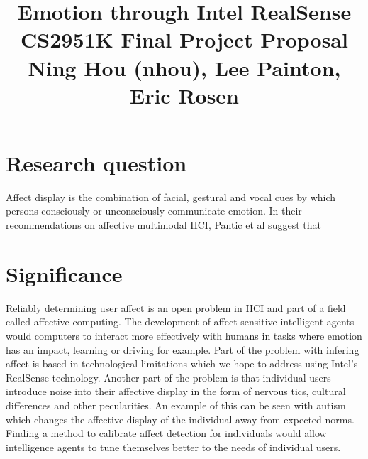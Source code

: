 \documentclass[12pt,letterpaper]{article}
\begin{document}
\title{Emotion through Intel RealSense\\ \vspace{2 mm} {\large CS2951K Final Project Proposal}\\ {\large Ning Hou (nhou), Lee Painton, Eric Rosen}}

\maketitle

\section{Research question}
Affect display is the combination of facial, gestural and vocal cues by which persons consciously or unconsciously communicate emotion.  In their recommendations on affective multimodal HCI, Pantic et al \cite[p. 3]{pantic2005affective} suggest that

\section{Significance}
Reliably determining user affect is an open problem in HCI and part of a field called affective computing.  The development of affect sensitive intelligent agents would computers to interact more effectively with humans in tasks where emotion has an impact, learning or driving for example.  Part of the problem with infering affect is based in technological limitations which we hope to address using Intel's RealSense technology.  Another part of the problem is that individual users introduce noise into their affective display in the form of nervous tics, cultural differences and other pecularities.  An example of this can be seen with autism which changes the affective display of the individual away from expected norms.  Finding a method to calibrate affect detection for individuals would allow intelligence agents to tune themselves better to the needs of individual users.

\end{document}
